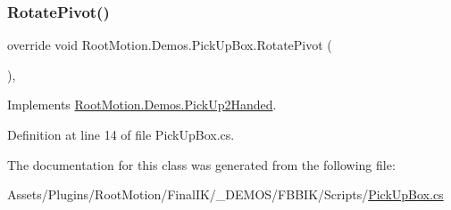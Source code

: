 \subsubsection{\texorpdfstring{Rotate\+Pivot()}{RotatePivot()}}
{\footnotesize\ttfamily override void Root\+Motion.\+Demos.\+Pick\+Up\+Box.\+Rotate\+Pivot (\begin{DoxyParamCaption}{ }\end{DoxyParamCaption})\hspace{0.3cm}{\ttfamily [protected]}, {\ttfamily [virtual]}}



Implements \mbox{\hyperlink{class_root_motion_1_1_demos_1_1_pick_up2_handed_af2cd4f4a54d4b2ee2d566f5541946f82}{Root\+Motion.\+Demos.\+Pick\+Up2\+Handed}}.



Definition at line 14 of file Pick\+Up\+Box.\+cs.



The documentation for this class was generated from the following file\+:\begin{DoxyCompactItemize}
\item 
Assets/\+Plugins/\+Root\+Motion/\+Final\+I\+K/\+\_\+\+D\+E\+M\+O\+S/\+F\+B\+B\+I\+K/\+Scripts/\mbox{\hyperlink{_pick_up_box_8cs}{Pick\+Up\+Box.\+cs}}\end{DoxyCompactItemize}

